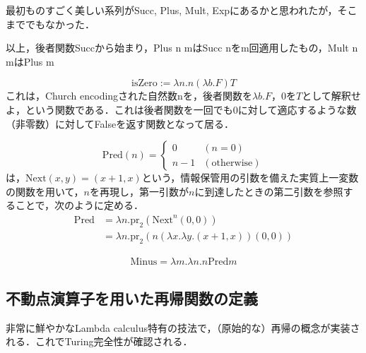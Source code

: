 \documentclass[uplatex, dvipdfmx]{jsreport}
\begin{document}
\begin{screen}
    最初ものすごく美しい系列がSucc, Plus, Mult, Expにあるかと思われたが，そこまででもなかった．

    以上，後者関数Succから始まり，Plus n mはSucc nをm回適用したもの，Mult n mはPlus m
\end{screen}

\begin{definition}[0判定真理値関数]
    \[ \mathrm{isZero} := \lambda n.n(\lambda b.F)T \]
    これは，Church encodingされた自然数nを，後者関数を$\lambda b.F$，0を$T$として解釈せよ，という関数である．これは後者関数を一回でも0に対して適応するような数（非零数）に対してFalseを返す関数となって居る．
\end{definition}

\begin{definition}[前者関数]
    \[\mathrm{Pred}(n)=\begin{cases}
        0 & (n=0)\\
        n-1 & \mathrm{(otherwise)}
    \end{cases}\]
    は，$\mathrm{Next}(x,y)=(x+1,x)$という，情報保管用の引数を備えた実質上一変数の関数を用いて，$n$を再現し，第一引数が$n$に到達したときの第二引数を参照することで，次のように定める．
    \begin{align*}
        \mathrm{Pred} &= \lambda n.\mathrm{pr}_2(\mathrm{Next}^n(0,0)) \\
        &= \lambda n.\mathrm{pr}_2(n(\lambda x.\lambda y.(x+1,x))(0,0))
    \end{align*}
\end{definition}
\begin{definition}[減算]
    \begin{align*}
        \mathrm{Minus} = \lambda m.\lambda n.n\mathrm{Pred}m
    \end{align*}
\end{definition}

\subsection{不動点演算子を用いた再帰関数の定義}
非常に鮮やかなLambda calculus特有の技法で，（原始的な）再帰の概念が実装される．これでTuring完全性が確認される．
\end{document}
